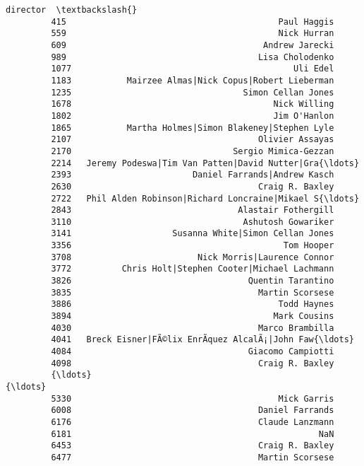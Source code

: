 \documentclass[11pt]{article}
\begin{document}
\begin{Verbatim}[commandchars=\\\{\}]
                                                         director  \textbackslash{}
         415                                          Paul Haggis   
         559                                          Nick Hurran   
         609                                       Andrew Jarecki   
         989                                      Lisa Cholodenko   
         1077                                            Uli Edel   
         1183           Mairzee Almas|Nick Copus|Robert Lieberman   
         1235                                  Simon Cellan Jones   
         1678                                        Nick Willing   
         1802                                        Jim O'Hanlon   
         1865           Martha Holmes|Simon Blakeney|Stephen Lyle   
         2107                                     Olivier Assayas   
         2170                                Sergio Mimica-Gezzan   
         2214   Jeremy Podeswa|Tim Van Patten|David Nutter|Gra{\ldots}   
         2393                        Daniel Farrands|Andrew Kasch   
         2630                                     Craig R. Baxley   
         2722   Phil Alden Robinson|Richard Loncraine|Mikael S{\ldots}   
         2843                                 Alastair Fothergill   
         3110                                  Ashutosh Gowariker   
         3141                    Susanna White|Simon Cellan Jones   
         3356                                          Tom Hooper   
         3708                         Nick Morris|Laurence Connor   
         3772          Chris Holt|Stephen Cooter|Michael Lachmann   
         3826                                   Quentin Tarantino   
         3835                                     Martin Scorsese   
         3886                                         Todd Haynes   
         3894                                        Mark Cousins   
         4030                                     Marco Brambilla   
         4041   Breck Eisner|FÃ©lix EnrÃ­quez AlcalÃ¡|John Faw{\ldots}   
         4084                                   Giacomo Campiotti   
         4098                                     Craig R. Baxley   
         {\ldots}                                                  {\ldots}   
         5330                                         Mick Garris   
         6008                                     Daniel Farrands   
         6176                                     Claude Lanzmann   
         6181                                                 NaN   
         6453                                     Craig R. Baxley   
         6477                                     Martin Scorsese   

\end{Verbatim}
\end{document}
